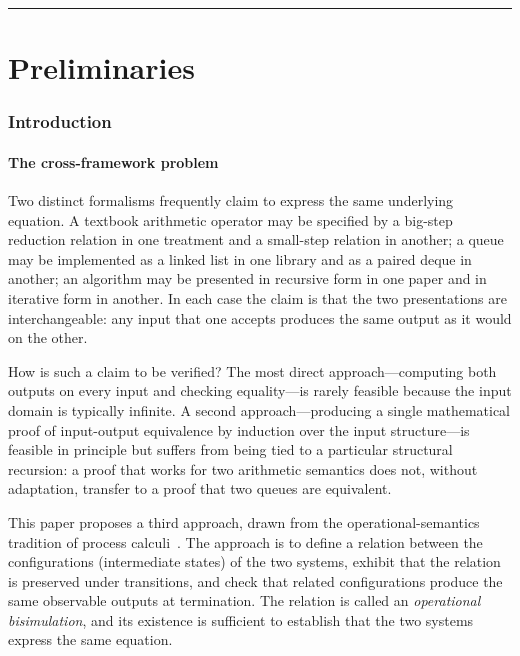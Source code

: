 \documentclass[twocolumn,11pt,a4paper]{article}
\begin{document}
\tableofcontents

\vspace{6pt}
\hrule
\vspace{6pt}

\part{Preliminaries}

\section{Introduction}
\label{sec:intro}

\subsection{The cross-framework problem}

Two distinct formalisms frequently claim to express the same underlying equation. A textbook arithmetic operator may be specified by a big-step reduction relation in one treatment and a small-step relation in another; a queue may be implemented as a linked list in one library and as a paired deque in another; an algorithm may be presented in recursive form in one paper and in iterative form in another. In each case the claim is that the two presentations are interchangeable: any input that one accepts produces the same output as it would on the other.

How is such a claim to be verified? The most direct approach---computing both outputs on every input and checking equality---is rarely feasible because the input domain is typically infinite. A second approach---producing a single mathematical proof of input-output equivalence by induction over the input structure---is feasible in principle but suffers from being tied to a particular structural recursion: a proof that works for two arithmetic semantics does not, without adaptation, transfer to a proof that two queues are equivalent.

This paper proposes a third approach, drawn from the operational-semantics tradition of process calculi~\citep{milner1980,park1981,milner1989}. The approach is to define a relation between the configurations (intermediate states) of the two systems, exhibit that the relation is preserved under transitions, and check that related configurations produce the same observable outputs at termination. The relation is called an \emph{operational bisimulation}, and its existence is sufficient to establish that the two systems express the same equation.
\end{document}
